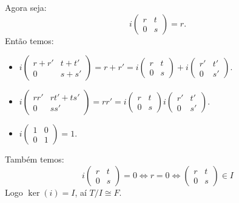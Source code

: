 \documentclass[10pt,a4paper]{article}
\begin{document}
\medskip
\noindent
Agora seja:
\[
i\begin{pmatrix}
r&t\\0&s
\end{pmatrix}=r.
\]
Então temos:
\begin{itemize}
\item $i\begin{pmatrix}
r+r'&t+t'\\0&s+s'
\end{pmatrix}=r+r'=i\begin{pmatrix}
r&t\\0&s
\end{pmatrix}+i\begin{pmatrix}
r'&t'\\0&s'
\end{pmatrix}.$
\item $i\begin{pmatrix}
rr'&rt'+ts'\\0&ss'
\end{pmatrix}=rr'=i\begin{pmatrix}
r&t\\0&s
\end{pmatrix}i\begin{pmatrix}
r'&t'\\0&s'
\end{pmatrix}.$
\item $i\begin{pmatrix}
1&0\\0&1
\end{pmatrix}=1.$
\end{itemize}
Também temos:
\[
i\begin{pmatrix}
r&t\\0&s
\end{pmatrix}=0\Leftrightarrow r=0\Leftrightarrow\begin{pmatrix}
r&t\\0&s
\end{pmatrix}\in I
\]
Logo $\ker(i)=I$, aí $T/I\cong F$.
\end{document}
